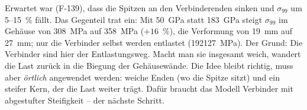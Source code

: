Erwartet war (F-139), dass die Spitzen an den Verbinderenden sinken und $\sigma_{99}$ um 5--15~\% fällt. Das Gegenteil
trat ein: Mit \SI{50}{GPa} statt \SI{183}{GPa} steigt $\sigma_{99}$ im Gehäuse von \SI{308}{MPa} auf \SI{358}{MPa}
($+16$~\%), die Verformung von \SI{19}{mm} auf \SI{27}{mm}; nur die Verbinder selbst werden entlastet
(\SI{192}{\to}\SI{127}{MPa}). Der Grund: Die Verbinder sind hier der Entlastungsweg. Macht man sie insgesamt weich,
wandert die Last zurück in die Biegung der Gehäusewände. Die Idee bleibt richtig, muss aber \emph{örtlich} angewendet
werden: weiche Enden (wo die Spitze sitzt) und ein steifer Kern, der die Last weiter trägt. Dafür braucht das Modell
Verbinder mit abgestufter Steifigkeit -- der nächste Schritt.
